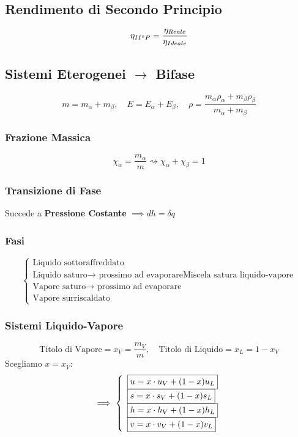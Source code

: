 \documentclass[a4paper]{report}
\begin{document}
\subsection*{Rendimento di Secondo Principio}
\[
    \eta_{II\degree P} = \frac{\eta_{Reale}}{\eta_{Ideale}}    
\]


\subsection*{Sistemi Eterogenei $\longrightarrow$ Bifase}
\[
    \boxed{m=m_\alpha+m_\beta}, \quad \boxed{E=E_\alpha+E_\beta}, \quad \boxed{\rho = \frac{m_\alpha \rho_\alpha + m_\beta \rho_\beta}{m_\alpha + m_\beta}}
\]
\subsubsection*{Frazione Massica}
\[
    \boxed{\chi_\alpha=\frac{m_\alpha}{m}} \rightsquigarrow \boxed{ \chi_\alpha + \chi_\beta = 1}
\]
\subsubsection*{Transizione di Fase}
Succede a \textbf{Pressione Costante} $\implies\boxed{dh= \delta q}$
\subsubsection*{Fasi}
\[
    \left\{ \begin{array}{l}
        \text{Liquido sottoraffreddato}\\
        \text{Liquido saturo} \rightarrow\text{ prossimo ad evaporare}
        \text{Miscela satura liquido-vapore}\\
        \text{Vapore saturo}\rightarrow\text{ prossimo ad evaporare}\\
        \text{Vapore surriscaldato}
    \end{array}\right.   
\]
\subsubsection*{Sistemi Liquido-Vapore}
\[
    \text{Titolo di Vapore} = \boxed{x_V=\frac{m_V}{m}}, \quad \text{Titolo di Liquido} = \boxed{x_L = 1 - x_V}
\]
Scegliamo $x=x_V$:
\[
    \implies \left\{\begin{array}[]{l}
        \boxed{ u = x\cdot u_V + (1-x)u_L}\\
        \boxed{ s = x\cdot s_V + (1-x)s_L}\\
        \boxed{ h = x\cdot h_V + (1-x)h_L}\\
        \boxed{ v = x\cdot v_V + (1-x)v_L}
    \end{array}
    \right.
\]
\end{document}
